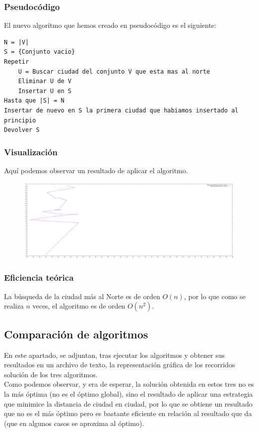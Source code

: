 \documentclass[11pt,a4paper]{article} %
\begin{document}
\subsubsection{Pseudocódigo}
El nuevo algoritmo que hemos creado en pseudocódigo es el siguiente:
\begin{lstlisting}
N = |V|
S = {Conjunto vacio}
Repetir
	U = Buscar ciudad del conjunto V que esta mas al norte
	Eliminar U de V
	Insertar U en S
Hasta que |S| = N
Insertar de nuevo en S la primera ciudad que habiamos insertado al principio
Devolver S
\end{lstlisting}

\subsubsection{Visualización}
Aquí podemos observar un resultado de aplicar el algoritmo.
\begin{figure}[H]
	\centering
	\includegraphics[width=13cm]{data/graphics/otro/otro.pdf}
\end{figure}

\subsubsection{Eficiencia teórica}
La búsqueda de la ciudad más al Norte es de orden $O(n)$, por lo que como se realiza $n$ veces, el algoritmo es de orden $O(n^2)$.


\newpage
\subsection{Comparación de algoritmos}
En este apartado, se adjuntan, tras ejecutar los algoritmos y obtener sus resultados en un archivo de texto, la representación gráfica de los recorridos solución de los tres algoritmos.\\

Como podemos observar, y era de esperar, la solución obtenida en estos tres no es la más óptima (no es el óptimo global), sino el resultado de aplicar una estrategia que minimice la distancia de ciudad en ciudad, por lo que se obtiene un resultado que no es el más óptimo pero es bastante eficiente en relación al resultado que da (que en algunos casos se aproxima al óptimo).
\end{document}
